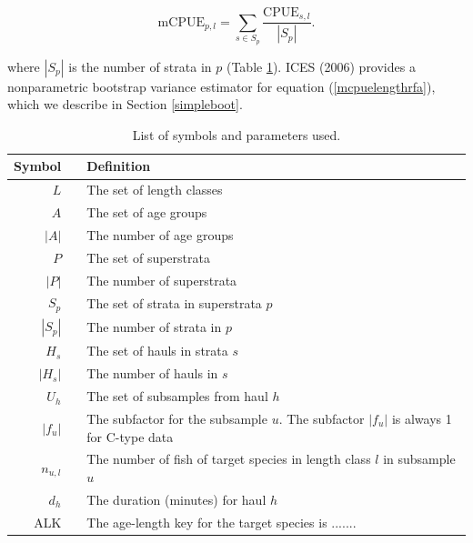 \documentclass[a4paper 12pt]{article}
\numberwithin{equation}{section}
\begin{document}
\begin{equation}
\mathrm{mCPUE}_{p,l} = \sum\limits_{s \in S_{p}} \frac{\mathrm{CPUE}_{s,l}}{|S_{p}|}.
\label{mcpuelengthrfa}
\end{equation}

where $|S_{p}|$ is the number of strata in $p$ (Table \ref{symbols}). ICES (2006) provides a nonparametric bootstrap variance estimator for equation (\ref{mcpuelengthrfa}), which we describe in Section \ref{simpleboot}. \\

\begin{table}[h!]
\centering
\caption{List of symbols and parameters used.}
\label{symbols}
\begin{tabularx}{\linewidth}{r l X}
\toprule 
Symbol   	&  & Definition                  \\[0.7ex]
\midrule
$L$        	&  & The set of length classes    \\[0.7ex]
$A$        	&  & The set of age groups       \\[0.7ex]
$|A|$      	&  & The number of age groups    \\[0.7ex]
$P$        	&  & The set of superstrata      \\[0.7ex]
$|P|$       &  & The number of superstrata   \\[0.7ex]
$S_{p}$     &  & The set of strata in superstrata $p$  \\[0.7ex]
$|S_{p}|$   &  & The number of strata in $p$  \\[0.7ex]
$H_{s}$     &  & The set of hauls in strata $s$  \\[0.7ex]
$|H_{s}|$   &  & The number of hauls in $s$  \\[0.7ex]
$U_{h}$     &  & The set of subsamples from haul $h$  \\[0.7ex]
$|f_{u}|$   &  & The subfactor for the subsample $u$. The subfactor $|f_{u}|$ is always 1 for C-type data  \\[0.7ex]
$n_{u,l}$   &  & The number of fish of target species in length class $l$ in subsample $u$  \\[0.7ex]
$d_{h}$   &  & The duration (minutes) for haul $h$  \\[0.7ex]
ALK  & & The age-length key for the target species is .......\\
\bottomrule         
\end{tabularx}
\end{table}
\end{document}
